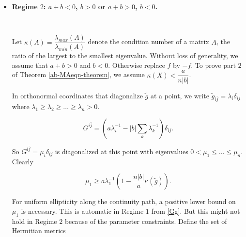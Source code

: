 \documentclass[11pt,letterpaper]{amsart}
\newcommand{\bj}{\bar{j}}
\newcommand{\bk}{\bar{k}}
\newtheorem{theorem}{Theorem}[section]
\numberwithin{equation}{section}
\begin{document}
\begin{itemize}
Note that $\sum\limits_k \tilde g^{k \bk} \geq n e^{-\frac{\psi}{n}}$ by the AM-GM inequality. Choosing $A$ larger than $\dfrac{C}{2\min\{a+b, b\}}$ now gives the gradient estimates $|\nabla f| \; \leq C$. 

\begin{theorem}\label{ABPexistence}
    Assuming $X >0$, there exists a smooth solution to \eqref{abMA-eqn+} unique up to an additive constant.
\end{theorem}



   The $C^0$ estimates for $f$ can be obtained using the ABP maximum principle as in \cite{Szekelyhidi18}. Note that strong positivity implies the positive-definiteness of the coefficient matrix, which is sufficient for the ABP maximum principle. We omit the argument here. Now by Evans-Krylov theory and the Schauder theorem, $|f|_{C^{\infty}}$ is uniformly bounded and Theorem \ref{ABPexistence} follows from standard continuity method arguments. 


\

\item {\bf Regime $2$: $a+b < 0$, $b > 0$ or $a+b >0$, $b < 0$.}

\


 Let $\kappa(A) = \dfrac{\lambda_{max}(A)}{\lambda_{min}(A)}$ denote the condition number of a matrix $A$, the ratio of the largest to the smallest eigenvalue. Without loss of generality, we assume that $a+b>0$ and $b<0$. Otherwise replace $f$ by $-f$. To prove part $2$ of Theorem \ref{ab-MAeqn-theorem}, we assume $\kappa(X) < \dfrac{a}{n|b|}$.

 

 In orthonormal coordinates that diagonalize $\tilde g$ at a point, we write $\tilde g_{i \bj} = \lambda_i \delta_{i j}$ where $\lambda_1 \geq  \lambda_2 \geq \hdots \geq \lambda_n >0$.

 $$G^{i \bj} = (a\lambda_i^{-1} - |b|  \sum_{k} \lambda_k^{-1}) \delta_{i j}. $$

So $G^{i \bj} = \mu_i \delta_{i j}$ is diagonalized at this point with eigenvalues  $0 < \mu_1 \leq \hdots \leq \mu_n $. Clearly

\begin{equation}\label{smallest-ev}
    \mu_1 \geq a\lambda_1^{-1}\left(1 - \frac{n|b|}{a}\kappa(\tilde{g})\right).
\end{equation}


For uniform ellipticity along the continuity path, a positive lower bound on $\mu_1$ is necessary. This is automatic in Regime $1$ from \eqref{Gg}. But this might not hold in Regime $2$ because of the parameter constraints. Define the set of Hermitian metrics


\end{itemize}
\end{document}
